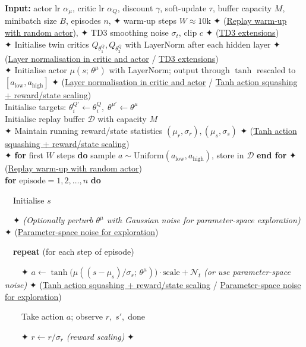 \documentclass[11pt]{article}
\begin{document}
\begin{pseudobox}
\textbf{Input:} actor lr \(\alpha_\mu\), critic lr \(\alpha_Q\),
discount \(\gamma\), soft-update \(\tau\), buffer capacity \(M\),
minibatch size \(B\), episodes \(n\), ✦ warm-up steps
\(W\!\approx\!10\text{k}\) ✦ (\hyperref[trick-4-5-5]{Replay warm-up with
random actor}), ✦ TD3 smoothing noise \(\sigma_t\), clip \(c\) ✦
(\hyperref[trick-4-5-4]{TD3 extensions})\\
✦ Initialise twin critics \(Q_{\theta_1^Q}, Q_{\theta_2^Q}\) with
LayerNorm after each hidden layer ✦ (\hyperref[trick-4-5-1]{Layer
normalisation in critic and actor} / \hyperref[trick-4-5-4]{TD3
extensions})\\
✦ Initialise actor \(\mu(s;\,\theta^\mu)\) with LayerNorm; output
through \(\tanh\) rescaled to \([a_\text{low}, a_\text{high}]\) ✦
(\hyperref[trick-4-5-1]{Layer normalisation in critic and actor} /
\hyperref[trick-4-5-3]{Tanh action squashing + reward/state scaling})\\
Initialise targets:
\(\theta_i^{Q'} \leftarrow \theta_i^Q,\;\theta^{\mu'} \leftarrow \theta^\mu\)\\
Initialise replay buffer \(\mathcal{D}\) with capacity \(M\)\\
✦ Maintain running reward/state statistics
\((\mu_r,\sigma_r),(\mu_s,\sigma_s)\) ✦ (\hyperref[trick-4-5-3]{Tanh
action squashing + reward/state scaling})\\
✦ \textbf{for} first \(W\) steps \textbf{do} sample
\(a \sim \mathrm{Uniform}(a_\text{low}, a_\text{high})\), store in
\(\mathcal{D}\) \textbf{end for} ✦ (\hyperref[trick-4-5-5]{Replay
warm-up with random actor})\\
\textbf{for} \(\text{episode} = 1, 2, \ldots, n\) \textbf{do}\\
\strut ~~Initialise \(s\)\\
\strut ~~✦ \emph{(Optionally perturb \(\theta^\mu\) with Gaussian noise
for parameter-space exploration)} ✦
(\hyperref[trick-4-5-2]{Parameter-space noise for exploration})\\
\strut ~~\textbf{repeat} (for each step of episode)\\
\strut ~~~~✦
\(a \leftarrow \tanh\!\bigl(\mu((s-\mu_s)/\sigma_s;\,\theta^\mu)\bigr) \cdot \text{scale} + \mathcal{N}_t\)
\emph{(or use parameter-space noise)} ✦ (\hyperref[trick-4-5-3]{Tanh
action squashing + reward/state scaling} /
\hyperref[trick-4-5-2]{Parameter-space noise for exploration})\\
\strut ~~~~Take action \(a\); observe \(r,\; s',\; \text{done}\)\\
\strut ~~~~✦ \(r \leftarrow r / \sigma_r\) \emph{(reward scaling)} ✦

\end{pseudobox}
\end{document}
